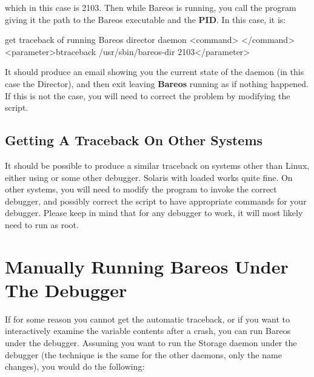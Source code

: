which in this case is 2103. Then while Bareos is running, you call the program
giving it the path to the Bareos executable and the {\bf PID}. In this case,
it is:

\begin{commands}{get traceback of running Bareos director daemon}
<command> </command><parameter>btraceback /usr/sbin/bareos-dir 2103</parameter>
\end{commands}

It should produce an email showing you the current state of the daemon (in
this case the Director), and then exit leaving {\bf Bareos} running as if
nothing happened. If this is not the case, you will need to correct the
problem by modifying the  script.


\subsection{Getting A Traceback On Other Systems}

It should be possible to produce a similar traceback on systems other than
Linux, either using  or some other debugger. 
Solaris with 
loaded works quite fine. On other systems, you will need to modify the 
 program to invoke the correct debugger, and possibly correct the
 script to have appropriate commands for your debugger.
Please keep in mind that for any debugger to
work, it will most likely need to run as root.

\section{Manually Running Bareos Under The Debugger}

If for some reason you cannot get the automatic traceback, or if you want to
interactively examine the variable contents after a crash, you can run Bareos
under the debugger. Assuming you want to run the Storage daemon under the
debugger (the technique is the same for the other daemons, only the name
changes), you would do the following:

